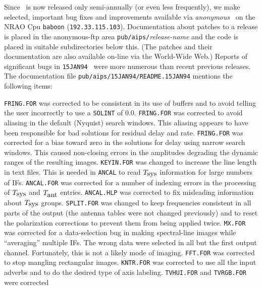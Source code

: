 Since \AIPS\ is now released only semi-annually (or even less
frequently), we make selected, important bug fixes and improvements
available via {\it anonymous} \ftp\ on the NRAO Cpu {\tt baboon}
({\tt 192.33.115.103}).  Documentation about patches to a release is
placed in the anonymous-ftp area {\tt pub/aips/}{\it release-name} and
the code is placed in suitable subdirectories below this.
(The patches and their documentation are also available on-line via
the World-Wide Web.)  Reports of significant bugs in {\tt 15JAN94}
\AIPS\ were more numerous than recent previous releases.  The
documentation file {\tt pub/aips/15JAN94/README.15JAN94} mentions the
following items:
\begin{description}
\vspace{-8pt}
 {\tt FRING.FOR} was corrected to be consistent in its
    use of buffers and to avoid telling the user incorrectly to use a
    {\tt SOLINT} of 0.0.
\myitem{\    } {\tt FRING.FOR} was corrected to avoid aliasing in the
   default (Nyquist) search windows.  This aliasing appears to have
   been responsible for bad solutions for residual delay and rate.
\myitem{\    } {\tt FRING.FOR} was corrected for a bias toward zero in
   the solutions for delay using narrow search windows.  This caused
   non-closing errors in the amplitudes degrading the dynamic ranges
   of the resulting images.
 {\tt KEYIN.FOR} was changed to increase the line length
   in text files.  This is needed in {\tt ANCAL} to read
   $T_{\hbox{sys}}$ information for large numbers of IFs.
\myitem{\    } {\tt ANCAL.FOR} was corrected for a number of indexing
    errors in the processing of $T_{\hbox{sys}}$ and $T_{\hbox{ant}}$
    entries.  {\tt ANCAL.HLP} was corrected to fix misleading
    information about $T_{\hbox{sys}}$ groups.
 {\tt SPLIT.FOR} was changed to keep frequencies
    consistent in all parts of the output (the antenna tables were not
    changed previously) and to reset the polarization corrections to
    prevent them from being applied twice.
 {\tt MX.FOR} was corrected for a data-selection bug in
   making spectral-line images while ``averaging'' multiple IFs.  The
   wrong data were selected in all but the first output channel.
   Fortunately, this is not a likely mode of imaging.
 {\tt FFT.FOR} was corrected to stop mangling rectangular
    images.
 {\tt KNTR.FOR} was corrected to use all the input
    adverbs and to do the desired type of axis labeling.
 {\tt TVHUI.FOR} and {\tt TVRGB.FOR} were corrected

\end{description}
